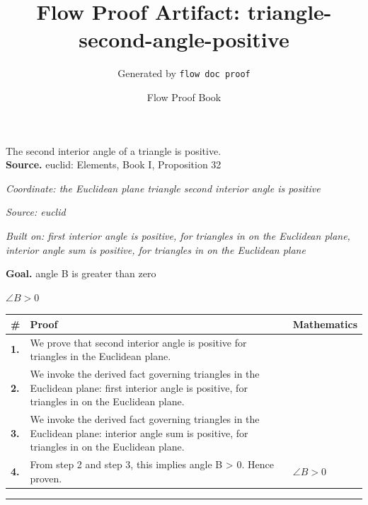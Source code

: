 \documentclass[11pt]{article}
\title{Flow Proof Artifact: triangle-second-angle-positive}
\author{Generated by \texttt{flow doc proof}}
\date{Flow Proof Book}
\theoremstyle{definition}
\begin{document}
\maketitle
The second interior angle of a triangle is positive.\\[0.5em]
\textbf{Source.} euclid: Elements, Book I, Proposition 32\\[0.5em]
\bigskip
{}\par
\smallskip\noindent\textit{Coordinate: the Euclidean plane \cdot triangle \cdot second interior angle is positive}\par
\smallskip\noindent\textit{Source: euclid}\par
\smallskip\noindent\textit{Built on: first interior angle is positive, for triangles in on the Euclidean plane, interior angle sum is positive, for triangles in on the Euclidean plane}\par
\medskip
\noindent\textbf{Goal.} angle B is greater than zero\par
\noindent$\displaystyle \angle B > 0$\par
\medskip
\noindent
\begin{tabular}{@{} >{\raggedright\arraybackslash}p{} >{\raggedright\arraybackslash}p{} >{\raggedleft\arraybackslash}p{} @{}}
\textbf{\#} & \textbf{Proof} & \textbf{Mathematics} \\
\midrule
\textbf{1.} & We prove that second interior angle is positive for triangles in the Euclidean plane. & \\[0.45em]
\textbf{2.} & We invoke the derived fact governing triangles in the Euclidean plane: first interior angle is positive, for triangles in on the Euclidean plane. & \\[0.45em]
\textbf{3.} & We invoke the derived fact governing triangles in the Euclidean plane: interior angle sum is positive, for triangles in on the Euclidean plane. & \\[0.45em]
\textbf{4.} & From step 2 and step 3, this implies angle B > 0. Hence proven. & $\displaystyle \angle B > 0$ \\[0.45em]
\bottomrule
\end{tabular}
\label{thm:Geometry-triangle-second_interior_angle_is_positive}
\par\medskip\hrule
\end{document}
